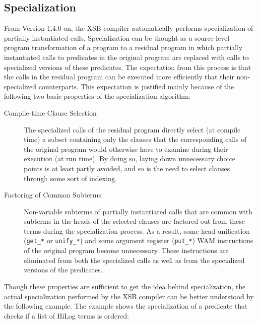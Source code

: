 \subsection{Specialization}\label{specialization}

From Version 1.4.0 on, the XSB compiler automatically performs
specialization of partially instantiated calls.  Specialization can be
thought as a source-level program transformation of a program to a
residual program in which partially instantiated calls to predicates
in the original program are replaced with calls to specialized versions
of these predicates.  The expectation from this process is that the
calls in the residual program can be executed more efficiently that
their non-specialized counterparts.  This expectation is justified
mainly because of the following two basic properties of the
specialization algorithm:
\begin{description}
\item[Compile-time Clause Selection] The specialized calls of the
	residual program  directly select (at compile time) a subset
	containing only the clauses that the corresponding calls of the
	original program would otherwise have to examine during their
	execution (at run time).  By doing so, laying down unnecessary
	choice points is at least partly avoided, and so is the need to
	select clauses through some sort of indexing.
\item[Factoring of Common Subterms] Non-variable subterms of partially
	instantiated calls that are common with subterms in the heads
	of the selected clauses are factored out from these terms
	during the specialization process.  As a result, some head
	unification ({\tt get\_*} or {\tt unify\_*}) and some argument
	register ({\tt put\_*}) WAM instructions of the original
	program become unnecessary.  These instructions are eliminated
	from both the specialized calls as well as from the specialized
	versions of the predicates.
\end{description}
Though these properties are sufficient to get the idea behind
specialization, the actual specialization performed by the XSB
compiler can be better understood by the following example.  The
example shows the specialization of a predicate that checks if a list
of HiLog terms is ordered:
